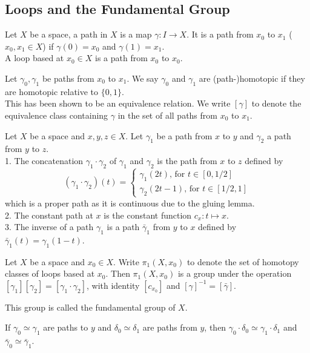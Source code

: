 \subsection{Loops and the Fundamental Group}
\begin{definition}
    Let $X$ be a space, a path in $X$ is a map $\gamma:I\to X$.
    It is a path from $x_0$ to $x_1$ ($x_0,x_1\in X$) if $\gamma(0)=x_0$ and $\gamma(1)=x_1$.\\
    A loop based at $x_0\in X$ is a path from $x_0$ to $x_0$.
\end{definition}
\begin{definition}
    Let $\gamma_0,\gamma_1$ be paths from $x_0$ to $x_1$.
    We say $\gamma_0$ and $\gamma_1$ are (path-)homotopic if they are homotopic relative to $\{0,1\}$.\\
    This has been shown to be an equivalence relation.
    We write $[\gamma]$ to denote the equivalence class containing $\gamma$ in the set of all paths from $x_0$ to $x_1$.
\end{definition}
\begin{definition}
    Let $X$ be a space and $x,y,z\in X$.
    Let $\gamma_1$ be a path from $x$ to $y$ and $\gamma_2$ a path from $y$ to $z$.\\
    1. The concatenation $\gamma_1\cdot \gamma_2$ of $\gamma_1$ and $\gamma_2$ is the path from $x$ to $z$ defined by
    $$(\gamma_1\cdot \gamma_2)(t)=\begin{cases}
        \gamma_1(2t)\text{, for $t\in [0,1/2]$}\\
        \gamma_2(2t-1)\text{, for $t\in [1/2,1]$}
    \end{cases}$$
    which is a proper path as it is continuous due to the gluing lemma.\\
    2. The constant path at $x$ is the constant function $c_x:t\mapsto x$.\\
    3. The inverse of a path $\gamma_1$ is a path $\bar\gamma_1$ from $y$ to $x$ defined by $\bar\gamma_1(t)=\gamma_1(1-t)$.
\end{definition}
\begin{theorem}\label{fund_group}
    Let $X$ be a space and $x_0\in X$.
    Write $\pi_1(X,x_0)$ to denote the set of homotopy classes of loops based at $x_0$.
    Then $\pi_1(X,x_0)$ is a group under the operation $[\gamma_1][\gamma_2]=[\gamma_1\cdot\gamma_2]$, with identity $[c_{x_0}]$ and $[\gamma]^{-1}=[\bar\gamma]$.
\end{theorem}
This group is called the fundamental group of $X$.
\begin{lemma}\label{fund_group_well_def}
    If $\gamma_0\simeq\gamma_1$ are paths to $y$ and $\delta_0\simeq \delta_1$ are paths from $y$, then $\gamma_0\cdot\delta_0\simeq\gamma_1\cdot\delta_1$ and $\bar\gamma_0\simeq\bar\gamma_1$.
\end{lemma}
